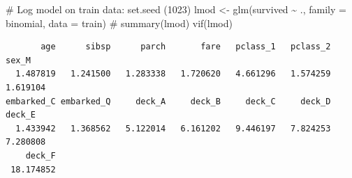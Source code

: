 \documentclass[
  letterpaper,
  DIV=11,
  numbers=noendperiod]{scrartcl}
\newenvironment{Shaded}{\begin{snugshade}}{\end{snugshade}}
\newcommand{\AttributeTok}[1]{\textcolor[rgb]{0.40,0.45,0.13}{#1}}
\newcommand{\CommentTok}[1]{\textcolor[rgb]{0.37,0.37,0.37}{#1}}
\newcommand{\DecValTok}[1]{\textcolor[rgb]{0.68,0.00,0.00}{#1}}
\newcommand{\FunctionTok}[1]{\textcolor[rgb]{0.28,0.35,0.67}{#1}}
\newcommand{\NormalTok}[1]{\textcolor[rgb]{0.00,0.23,0.31}{#1}}
\newcommand{\OtherTok}[1]{\textcolor[rgb]{0.00,0.23,0.31}{#1}}
\newcommand{\SpecialCharTok}[1]{\textcolor[rgb]{0.37,0.37,0.37}{#1}}
\begin{document}
\begin{Shaded}
\begin{Highlighting}[]
\CommentTok{\# Log model on train data:}
\FunctionTok{set.seed}\NormalTok{ (}\DecValTok{1023}\NormalTok{)}
\NormalTok{lmod }\OtherTok{\textless{}{-}} \FunctionTok{glm}\NormalTok{(survived }\SpecialCharTok{\textasciitilde{}}\NormalTok{ ., }\AttributeTok{family =}\NormalTok{ binomial, }\AttributeTok{data =}\NormalTok{ train)}
\CommentTok{\# summary(lmod)}
\FunctionTok{vif}\NormalTok{(lmod)}
\end{Highlighting}
\end{Shaded}

\begin{verbatim}
       age      sibsp      parch       fare   pclass_1   pclass_2      sex_M 
  1.487819   1.241500   1.283338   1.720620   4.661296   1.574259   1.619104 
embarked_C embarked_Q     deck_A     deck_B     deck_C     deck_D     deck_E 
  1.433942   1.368562   5.122014   6.161202   9.446197   7.824253   7.280808 
    deck_F 
 18.174852 
\end{verbatim}
\end{document}
